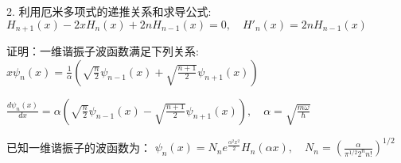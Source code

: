 2. 利用厄米多项式的递推关系和求导公式:
$H_{n+1}(x) - 2xH_n(x) + 2nH_{n-1}(x) = 0, \quad H'_n(x) = 2nH_{n-1}(x)$

证明：一维谐振子波函数满足下列关系:
$x\psi_n(x) = \frac{1}{\alpha}\left(\sqrt{\frac{n}{2}}\psi_{n-1}(x) + \sqrt{\frac{n+1}{2}}\psi_{n+1}(x)\right)$

$\frac{d\psi_n(x)}{dx} = \alpha\left(\sqrt{\frac{n}{2}}\psi_{n-1}(x) - \sqrt{\frac{n+1}{2}}\psi_{n+1}(x)\right), \quad \alpha = \sqrt{\frac{m\omega}{\hbar}}$

已知一维谐振子的波函数为：
$\psi_n(x) = N_n e^{\frac{\alpha^2 x^2}{2}} H_n(\alpha x), \quad N_n = \left(\frac{\alpha}{\pi^{1/2} 2^n n!}\right)^{1/2}$

